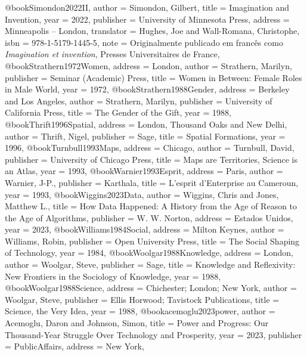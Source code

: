 @book{Simondon2022II,
  author    = {Simondon, Gilbert},
  title     = {{Imagination and Invention}},
  year      = {2022},
  publisher = {University of Minnesota Press},
  address   = {Minneapolis -- London},
  translator = {Hughes, Joe and Wall-Romana, Christophe},
  isbn      = {978-1-5179-1445-5},
  note      = {Originalmente publicado em francês como \textit{Imagination et invention}, Presses Universitaires de France},
}
@book{Strathern1972Women,
  address   = {London},
  author    = {Strathern, Marilyn},
  publisher = {Seminar (Academic) Press},
  title     = {{Women in Between: Female Roles in Male World}},
  year      = {1972},
}
@book{Strathern1988Gender,
  address   = {Berkeley and Los Angeles},
  author    = {Strathern, Marilyn},
  publisher = {University of California Press},
  title     = {{The Gender of the Gift}},
  year      = {1988},
}
@book{Thrift1996Spatial,
  address   = {London, Thousand Oaks and New Delhi},
  author    = {Thrift, Nigel},
  publisher = {Sage},
  title     = {{Spatial Formations}},
  year      = {1996},
}
@book{Turnbull1993Maps,
  address   = {Chicago},
  author    = {Turnbull, David},
  publisher = {University of Chicago Press},
  title     = {{Maps are Territories, Science is an Atlas}},
  year      = {1993},
}
@book{Warnier1993Esprit,
  address   = {Paris},
  author    = {Warnier, J-P.},
  publisher = {Karthala},
  title     = {{L'esprit d'Enterprise au Cameroun}},
  year      = {1993},
}
@book{Wiggins2023Data,
  author    = {Wiggins, Chris and Jones, Matthew L.},
  title     = {{How Data Happened: A History from the Age of Reason to the Age of Algorithms}},
  publisher = {W. W. Norton},
  address   = {Estados Unidos},
  year      = {2023},
}
@book{Williams1984Social,
  address   = {Milton Keynes},
  author    = {Williams, Robin},
  publisher = {Open University Press},
  title     = {{The Social Shaping of Technology}},
  year      = {1984},
}
@book{Woolgar1988Knowledge,
  address   = {London},
  author    = {Woolgar, Steve},
  publisher = {Sage},
  title     = {{Knowledge and Reflexivity: New Frontiers in the Sociology of Knowledge}},
  year      = {1988},
}
@book{Woolgar1988Science,
  address   = {Chichester; London; New York},
  author    = {Woolgar, Steve},
  publisher = {Ellis Horwood; Tavistock Publications},
  title     = {{Science, the Very Idea}},
  year      = {1988},
}
@book{acemoglu2023power,
  author    = {Acemoglu, Daron and Johnson, Simon},
  title     = {Power and Progress: Our Thousand-Year Struggle Over Technology and Prosperity},
  year      = {2023},
  publisher = {PublicAffairs},
  address   = {New York},
}

